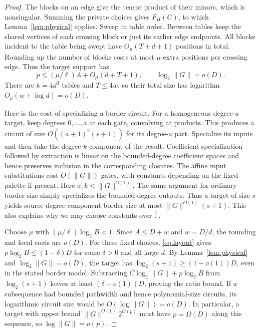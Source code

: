 \documentclass[11pt]{article}
\theoremstyle{definition}
\newcommand{\F}{\mathbb F}
\newcommand{\olF}{\overline{\F}}
\begin{document}
\begin{proof}
The blocks on an edge give the tensor product of their minors, which is nonsingular. Summing the private choices gives \(F_H(C)\), to which Lemma~\ref{lem:physical} applies. Sweep in table order. Between tables keep the shared vertices of each crossing block or just its earlier edge endpoints. All blocks incident to the table being swept have \(O_\mu(T+d+1)\) positions in total. Rounding up the number of blocks costs at most \(\mu\) extra positions per crossing edge. Thus the target support has
\begin{equation}\label{eq:layout}
 p\le(\mu/\ell)A+O_\mu(d+T+1),\qquad \log_2 \|G\|=o(D).
\end{equation}
There are \(k=4d^3\) tables and \(T\le4w\), so their total size has logarithm \(O_\mu(w+\log d)=o(D)\).

Here is the cost of specializing a border circuit. For a homogeneous degree-\(a\) target, keep degrees \(0,\ldots,a\) at each gate, convolving at products. This produces a circuit of size \(O((a+1)^2(s+1))\) for its degree-\(a\) part. Specialize its inputs and then take the degree-\(k\) component of the result. Coefficient specialization followed by extraction is linear on the bounded-degree coefficient spaces and hence preserves inclusion in the corresponding closures. The affine input substitutions cost \(O(\|G\|)\) gates, with constants depending on the fixed palette if present. Here \(a,k\le \|G\|^{O(1)}\). The same argument for ordinary border size simply specializes the bounded-degree outputs. Thus a target of size \(s\) yields source degree-component border size at most \(\|G\|^{O(1)}(s+1)\). This also explains why we may choose constants over \(\olF\).

Choose \(\mu\) with \((\mu/\ell)\log_2 B<1\). Since \(A\le D+w\) and \(w=D/d\), the rounding and local costs are \(o(D)\). For these fixed choices, \eqref{eq:layout} gives \(p\log_2 B\le(1-\delta)D\) for some \(\delta>0\) and all large \(d\). By Lemma~\ref{lem:physical} and \(\log_2 \|G\|=o(D)\), the target has \(\log_2(s+1)\ge(1-o(1))D\), even in the stated border model. Subtracting \(C\log_2 \|G\|+p\log_2 B\) from \(\log_2(s+1)\) leaves at least \((\delta-o(1))D\), proving the ratio bound. If a subsequence had bounded pathwidth and hence polynomial-size circuits, its logarithmic circuit size would be \(O(\log \|G\|)=o(D)\). In particular, a target with upper bound \(\|G\|^{O(1)}2^{O(p)}\) must have \(p=\Omega(D)\) along this sequence, so \(\log \|G\|=o(p)\).
\end{proof}
\end{document}
